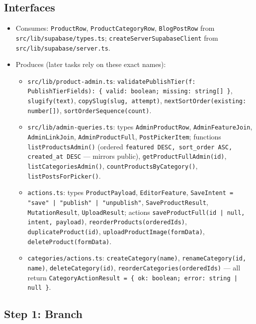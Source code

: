 \documentclass[11pt,a4paper]{article}
\begin{document}
\subsection*{Interfaces}
\begin{itemize}
  \item Consumes: \texttt{ProductRow}, \texttt{ProductCategoryRow}, \texttt{BlogPostRow} from
        \texttt{src/lib/supabase/types.ts}; \texttt{createServerSupabaseClient} from
        \texttt{src/lib/supabase/server.ts}.
  \item Produces (later tasks rely on these exact names):
  \begin{itemize}
    \item \texttt{src/lib/product-admin.ts}:
          \lstinline!validatePublishTier(f: PublishTierFields): { valid: boolean; missing: string[] }!,
          \lstinline!slugify(text)!, \lstinline!copySlug(slug, attempt)!,
          \lstinline!nextSortOrder(existing: number[])!, \lstinline!sortOrderSequence(count)!.
    \item \texttt{src/lib/admin-queries.ts}: types \texttt{AdminProductRow}, \texttt{AdminFeatureJoin},
          \texttt{AdminLinkJoin}, \texttt{AdminProductFull}, \texttt{PostPickerItem}; functions
          \lstinline!listProductsAdmin()! (ordered \texttt{featured DESC, sort\_order ASC, created\_at
          DESC} --- mirrors public), \lstinline!getProductFullAdmin(id)!, \lstinline!listCategoriesAdmin()!,
          \lstinline!countProductsByCategory()!, \lstinline!listPostsForPicker()!.
    \item \texttt{actions.ts}: types \texttt{ProductPayload}, \texttt{EditorFeature},
          \lstinline!SaveIntent = "save" | "publish" | "unpublish"!, \texttt{SaveProductResult},
          \texttt{MutationResult}, \texttt{UploadResult}; actions
          \lstinline!saveProductFull(id | null, intent, payload)!, \lstinline!reorderProducts(orderedIds)!,
          \lstinline!duplicateProduct(id)!, \lstinline!uploadProductImage(formData)!,
          \lstinline!deleteProduct(formData)!.
    \item \texttt{categories/actions.ts}: \lstinline!createCategory(name)!,
          \lstinline!renameCategory(id, name)!, \lstinline!deleteCategory(id)!,
          \lstinline!reorderCategories(orderedIds)! --- all return
          \lstinline!CategoryActionResult = { ok: boolean; error: string | null }!.
  \end{itemize}
\end{itemize}

\subsection*{Step 1: Branch}
\end{document}
